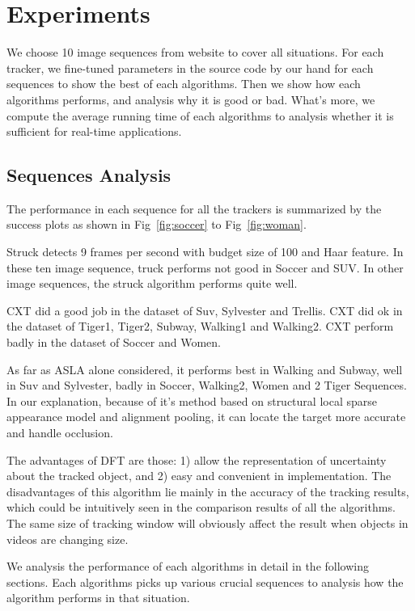 \documentclass{acm_proc_article-sp}
\begin{document}
\section{Experiments}

We choose 10 image sequences from website \cite{dataset} to cover all situations.
For each tracker, we fine-tuned parameters in the source code by our hand for each sequences to show the best of each algorithms. Then we show how each algorithms performs, and analysis why it is good or bad. What's more, we compute the average running time of each algorithms to analysis whether it is sufficient for real-time applications. 

\subsection{Sequences Analysis}

The performance in each sequence for all the trackers is summarized by the success plots as shown in Fig~\ref{fig:soccer} to Fig~\ref{fig:woman}.

Struck detects 9 frames per second with budget size of 100 and Haar feature.
In these ten image sequence, truck performs not good in Soccer and SUV.
In other image sequences, the struck algorithm performs quite well.

CXT did a good job in the dataset of Suv, Sylvester and Trellis. CXT did ok in the dataset of Tiger1, Tiger2, Subway, Walking1 and Walking2. CXT perform badly in the dataset of Soccer and Women.

As far as ASLA alone considered, it performs best in Walking and Subway, well in Suv and Sylvester, badly in Soccer, Walking2, Women and 2 Tiger Sequences. 
In our explanation, because of it's method based on structural local sparse appearance model and alignment pooling, it can locate the target more accurate and handle occlusion. 

The advantages of DFT are those: 1) allow the representation of uncertainty about the tracked object, and 2) easy and convenient in implementation. 
The disadvantages of this algorithm lie mainly in the accuracy of the tracking results, which could be intuitively seen in the comparison results of all the algorithms.
The same size of tracking window will obviously affect the result when objects in videos are changing size.

We analysis the performance of each algorithms in detail in the following sections. Each algorithms picks up various crucial sequences to analysis how the algorithm performs in that situation.
\end{document}
